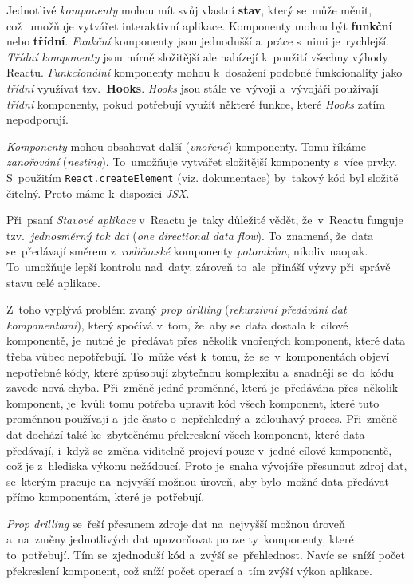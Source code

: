 \documentclass[10pt,a4paper]{article}
\begin{document}
            Jednotlivé \emph{komponenty} mohou mít svůj vlastní \textbf{stav}, který se~může měnit, což~umožňuje vytvářet interaktivní aplikace. Komponenty mohou být \textbf{funkční} nebo \textbf{třídní}. \emph{Funkční} komponenty jsou jednodušší a~práce s~nimi je~rychlejší. \emph{Třídní komponenty} jsou mírně složitější ale nabízejí k~použití všechny výhody Reactu. \emph{Funkcionální} komponenty mohou k~dosažení podobné funkcionality jako \emph{třídní} využívat tzv.~\textbf{Hooks}. \emph{Hooks} jsou stále ve~vývoji a~vývojáři používají \emph{třídní} komponenty, pokud potřebují využít některé funkce, které \emph{Hooks} zatím nepodporují.

            \emph{Komponenty} mohou obsahovat další (\emph{vnořené}) komponenty. Tomu říkáme \emph{zanořování} (\emph{nesting}). To~umožňuje vytvářet složitější komponenty s~více prvky. S~použitím \href{https://react.dev/reference/react/createElement}{\texttt{React.createElement} (viz. dokumentace)} by~takový kód byl složitě čitelný. Proto máme k~dispozici \emph{JSX}.

            Při~psaní \emph{Stavové aplikace} v~Reactu je~taky důležité vědět, že~v~Reactu funguje tzv.~\emph{jednosměrný tok dat} (\emph{one directional data flow}). To~znamená, že~data se~předávají směrem z~\emph{rodičovské} komponenty \emph{potomkům}, nikoliv naopak. To~umožňuje lepší kontrolu nad~daty, zároveň to~ale~přináší výzvy při~správě stavu celé aplikace.
            
            Z~toho vyplývá problém zvaný \emph{prop drilling} (\emph{rekurzivní předávání dat komponentami}), který spočívá v~tom, že~aby se~data dostala k~cílové komponentě, je~nutné je~předávat přes~několik vnořených komponent, které data třeba vůbec nepotřebují. To~může vést k~tomu, že~se~v~komponentách objeví nepotřebné kódy, které způsobují zbytečnou komplexitu a~snadněji se~do~kódu zavede nová chyba. Při~změně jedné proměnné, která je~předávána přes~několik komponent, je~kvůli tomu potřeba upravit kód všech komponent, které tuto proměnnou používají a~jde často o~nepřehledný a~zdlouhavý proces. Při~změně dat dochází také ke~zbytečnému překreslení všech komponent, které data předávají, i~když se~změna viditelně projeví pouze v~jedné cílové komponentě, což je z~hlediska výkonu nežádoucí. Proto je~snaha vývojáře přesunout zdroj dat, se~kterým pracuje na~nejvyšší možnou úroveň, aby bylo~možné data předávat přímo komponentám, které je~potřebují.

            \emph{Prop drilling} se~řeší přesunem zdroje dat na~nejvyšší možnou úroveň a~na~změny jednotlivých dat upozorňovat pouze ty~komponenty, které to~potřebují. Tím se~zjednoduší kód a~zvýší se~přehlednost. Navíc se~sníží počet překreslení komponent, což sníží počet operací a~tím zvýší výkon aplikace.
            
\end{document}
